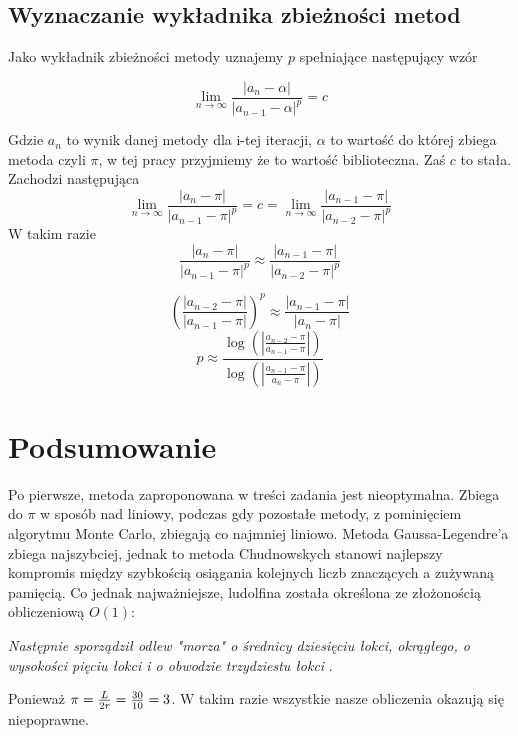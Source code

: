 \documentclass[11pt, wide, leqno]{mwart}
\begin{document}
\subsection{Wyznaczanie wykładnika zbieżności metod}

Jako wykładnik zbieżności metody uznajemy $p$ spełniające następujący wzór \cite{bog}

\[\lim_{n \to \infty} \frac{|a_n - \alpha|}{|a_{n-1} - \alpha|^p} = c  \]

Gdzie $a_n$ to wynik danej metody dla i-tej iteracji, $\alpha$ to wartość do której zbiega metoda czyli $\pi$, w tej pracy przyjmiemy że to wartość biblioteczna. Zaś $c$ to stała. Zachodzi następująca
\[ \lim_{n \to \infty} \frac{|a_n - \pi|}{|a_{n-1} - \pi|^p} = c = \lim_{n \to \infty} \frac{|a_{n-1} - \pi|}{|a_{n-2} - \pi|^p} \]
W takim razie 
\[ \frac{|a_n - \pi|}{|a_{n-1} - \pi|^p} \approx \frac{|a_{n-1} - \pi|}{|a_{n-2} - \pi|^p} \]

\[ (\frac{|a_{n-2} - \pi|}{|a_{n-1} - \pi|})^p \approx \frac{|a_{n-1} - \pi|}{|a_{n} - \pi|} \]
\[ p \approx \frac{\log(|\frac{a_{n-2} - \pi}{a_{n-1} - \pi}|)}{\log(|\frac{a_{n-1} - \pi}{a_{n} - \pi}|)}
\]









\newpage

\section{Podsumowanie}

Po pierwsze, metoda zaproponowana w treści zadania jest nieoptymalna. Zbiega do $\pi$ w sposób nad liniowy, podczas gdy pozostałe metody, z pominięciem algorytmu Monte Carlo, zbiegają co najmniej liniowo. Metoda Gaussa-Legendre'a zbiega najszybciej, jednak to metoda Chudnowskych stanowi najlepszy kompromis między szybkością osiągania kolejnych liczb znaczących a zużywaną pamięcią. Co jednak najważniejsze, ludolfina została określona ze złożonością obliczeniową $O(1)$: 

\begin{center}
    \emph{Następnie sporządził odlew "morza" o średnicy dziesięciu łokci, okrągłego, o wysokości pięciu łokci i o obwodzie trzydziestu łokci} \cite{biblia}. 
\end{center}
Ponieważ $\pi={L\over 2r}={30\over 10}=3$. W takim razie wszystkie nasze obliczenia okazują się niepoprawne.
\end{document}
